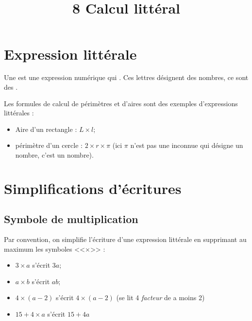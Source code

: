 \documentclass[12pt,a4paper]{article}
\date{}
\title{\textcircled{{\normalsize{8}}} Calcul littéral}
\begin{document}








\section{Expression littérale}


\begin{mydef}
	Une  est une expression numérique qui . Ces lettres désignent des nombres, ce sont des .
\end{mydef}

\begin{myexs}
	Les formules de calcul de périmètres et d'aires sont des exemples d'expressions littérales :
	\begin{itemize}
		\item Aire d'un rectangle : $L \times l$;
		\item périmètre d'un cercle : $2 \times r \times \pi$ (ici $\pi$ n'est pas une inconnue qui désigne un nombre, c'est un nombre).
	\end{itemize}
\end{myexs}

\section{Simplifications d'écritures}

\subsection{Symbole de multiplication}
\begin{mymeth}
	Par convention, on simplifie l'écriture d'une expression littérale en supprimant au maximum les symboles <<$\times$>> :
	\begin{itemize}
		\item $3 \times a $ s'écrit $3a$;
		\item $a \times b $ s'écrit $ab$;
		\item $4 \times (a - 2)$ s'écrit $4 \times (a - 2)$ (se lit 4 \textit{facteur} de a moins 2)
		\item $15 + 4 \times a$ s'écrit $15 + 4a$
	\end{itemize}
\end{mymeth}
\end{document}
